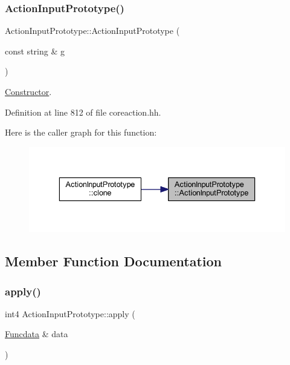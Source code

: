 \subsubsection{\texorpdfstring{ActionInputPrototype()}{ActionInputPrototype()}}
{\footnotesize\ttfamily Action\+Input\+Prototype\+::\+Action\+Input\+Prototype (\begin{DoxyParamCaption}\item[{const string \&}]{g }\end{DoxyParamCaption})\hspace{0.3cm}{\ttfamily [inline]}}



\mbox{\hyperlink{class_constructor}{Constructor}}. 



Definition at line 812 of file coreaction.\+hh.

Here is the caller graph for this function\+:
\nopagebreak
\begin{figure}[H]
\begin{center}
\leavevmode
\includegraphics[width=336pt]{class_action_input_prototype_a9b8cea2e70db69b470fc06b8581626df_icgraph}
\end{center}
\end{figure}


\subsection{Member Function Documentation}
\mbox{\label{class_action_input_prototype_ace1078c436c86aba604abb99b82180ae}} 
\subsubsection{\texorpdfstring{apply()}{apply()}}
{\footnotesize\ttfamily int4 Action\+Input\+Prototype\+::apply (\begin{DoxyParamCaption}\item[{\mbox{\hyperlink{class_funcdata}{Funcdata}} \&}]{data }\end{DoxyParamCaption})\hspace{0.3cm}{\ttfamily [virtual]}}



